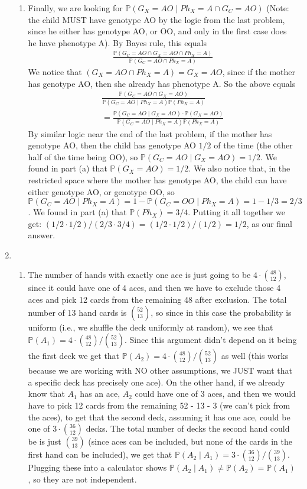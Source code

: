 \documentclass[12pt]{article}
\theoremstyle{definition}
\theoremstyle{remark}
\renewcommand{\P}{\mathbb{P}}
\begin{document}
\begin{enumerate}[leftmargin=\labelsep]
\begin{enumerate}
			\item Finally, we are looking for $\P(G_X = AO \mid Ph_X = A \cap G_C = AO)$ (Note: the child MUST have genotype AO by the logic from the last problem, since he either has genotype AO, or OO, and only in the first case does he have phenotype A). By Bayes rule, this equals 
			\begin{align*}
				\frac{\P(G_C = AO \cap G_X = AO \cap Ph_X = A)}{\P(G_C = AO \cap Ph_X = A)}
			\end{align*}
			We notice that $(G_X = AO \cap Ph_X = A) = G_X = AO$, since if the mother has genotype AO, then she already has phenotype A. So the above equals
			\begin{align*}
				\frac{\P(G_C = AO \cap G_X = AO)}{\P(G_C = AO \mid Ph_X = A) \P(Ph_X = A)} \\
				= \frac{\P(G_C = AO \mid G_X = AO) \cdot \P(G_X = AO)}{\P(G_C = AO \mid Ph_X = A) \P(Ph_X = A)}
			\end{align*}
			By similar logic near the end of the last problem, if the mother has genotype AO, then the child has genotype AO $1/2$ of the time (the other half of the time being OO), so $\P(G_C = AO \mid G_X = AO) = 1/2$. We found in part (a) that $\P(G_X = AO) = 1/2$. We also notice that, in the restricted space where the mother has genotype AO, the child can have either genotype AO, or genotype OO, so $\P(G_C = AO \mid Ph_X = A) = 1 - \P(G_C = OO \mid Ph_X = A) = 1 - 1/3 = 2/3$. We found in part (a) that $\P(Ph_X) = 3/4$. Putting it all together we get: $(1/2 \cdot 1/2)/(2/3 \cdot 3/4) = (1/2 \cdot 1/2) / (1/2) = 1/2$, as our final answer.
			\end{enumerate}
	
		\newpage
		\item \begin{enumerate}
			\item The number of hands with exactly one ace is just going to be $4 \cdot {48 \choose 12}$, since it could have one of 4 aces, and then we have to exclude those 4 aces and pick 12 cards from the remaining 48 after exclusion. The total number of 13 hand cards is ${52 \choose 13}$, so since in this case the probability is uniform (i.e., we shuffle the deck uniformly at random), we see that $\P(A_1) = 4 \cdot {48 \choose 12} / {52 \choose 13}$. Since this argument didn't depend on it being the first deck we get that $\P(A_2) = 4 \cdot {48 \choose 12} / {52 \choose 13}$ as well (this works because we are working with NO other assumptions, we JUST want that a specific deck has precisely one ace). On the other hand, if we already know that $A_1$ has an ace, $A_2$ could have one of 3 aces, and then we would have to pick 12 cards from the remaining 52 - 13 - 3 (we can't pick from the aces), to get that the second deck, assuming it has one ace, could be one of $3 \cdot {36 \choose 12}$ decks. The total number of decks the second hand could be is just ${39 \choose 13}$ (since aces can be included, but none of the cards in the first hand can be included), we get that $\P(A_2 \mid A_1) = 3 \cdot {36 \choose 12} / {39 \choose 13}$. Plugging these into a calculator shows $\P(A_2 \mid A_1) \neq \P(A_2) = \P(A_1)$, so they are not independent.
			

\end{enumerate}
\end{enumerate}
\end{document}
